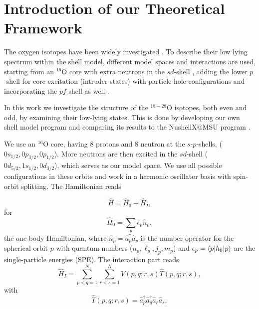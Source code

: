 \section{Introduction of our Theoretical Framework}
The oxygen isotopes have been widely investigated \citep[for a review see][]{Brown2017}. To describe their low lying spectrum within the shell model, different model spaces and interactions are used, starting from an $^{16}$O core with extra neutrons in the $sd$-shell \cite{Kuo1966,Wildenthal1984,Brown1988,Brown2006}, adding the lower $p$-shell for core-excitation (intruder states) with particle-hole configurations \cite{Lawson1976} and incorporating the $pf$-shell as well \cite{Utsuno1999}.

In this work we investigate the structure of the $^{18-28}$O isotopes, both even and odd, by examining their low-lying states. This is done by developing our own shell model program and comparing its results to the NushellX@MSU program \cite{Brown2014}.

We use an $^{16}$O core, having 8 protons and 8 neutron at the $s$-$p$-shells, ($0s_{1/2},0p_{3/2},0p_{1/2}$). 
More neutrons are then excited in the $sd$-shell ($0d_{5/2},1s_{1/2},0d_{3/2}$), which serves as our model space. We use all possible configurations in these orbits and work in a harmonic oscillator basis with spin-orbit splitting. 
The Hamiltonian reads

		\begin{equation} \label{eq:H}
		\hat H = \hat H_0 + \hat H_I,
		\end{equation}
for
		\begin{equation} \label{eq:H_0}
		\hat H_0 = \sum_{p} \epsilon_p \hat n_{p},
		\end{equation}
the one-body Hamiltonian, where $\hat n_p = \hat a_p^\dagger \hat a_p$ is the number operator for the spherical orbit $p$ with quantum numbers ($n_p,\ell_p,j_p,m_p$) and $\epsilon_p = \braket{p|h_0|p}$ are the single-particle energies (SPE). The interaction part reads
		\begin{equation} \label{eq:V}
		\hat H_I = \sum_{p < q=1}^{N} \sum_{r < s=1}^{N} V(p,q;r,s) \hat T(p,q;r,s),
		\end{equation}
		with
		\begin{equation} \label{eq:P}
		\hat T(p,q;r,s)  = \hat a_p^\dagger \hat a_q^\dagger \hat a_r \hat a_s,
		\end{equation}

